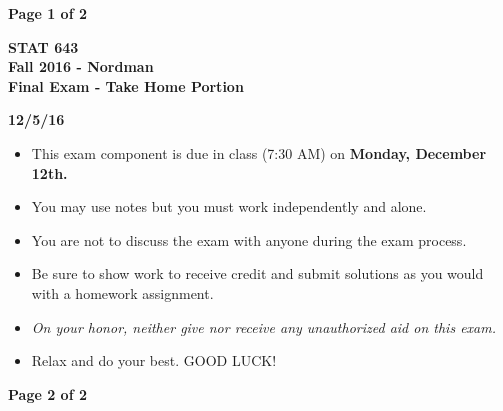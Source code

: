 \documentclass[12pt]{article}
\begin{document}
\textbf{\hspace*{1cm} \hfill Page 1 of 2}
\vspace*{3cm}
\begin{center}{\Large


\bf STAT 643  \\   Fall 2016 - Nordman \\
\vspace{.2cm}  Final Exam - Take Home Portion\\}
\vspace{.2cm} {\large {\bf 12/5/16}  \\ 
}
\end{center}

\vspace*{2cm}
\begin{center}{\large

\begin{itemize} \itemsep .4cm
\item This exam component is due in class (7:30 AM) on \textbf{Monday, December 12th.}
\item You may use notes but you must work independently and alone.
 \item You are not to discuss the exam with anyone during the exam process.

\item Be sure to show work to receive  credit and submit solutions as you would with a homework assignment.
 \item {\em On your honor, neither give nor receive  any unauthorized aid on this exam.}
\item Relax and do your best.  GOOD LUCK!
\end{itemize}



 }
\end{center}
\newpage
\textbf{\hspace*{1cm} \hfill Page 2 of 2}
\end{document}
